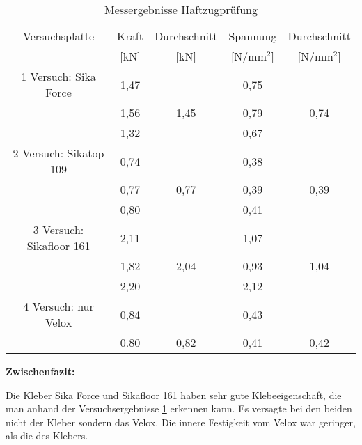 \documentclass[12 pt,a4 paper ]{scrreprt}
\begin{document}
\begin{table}
\caption{Messergebnisse Haftzugprüfung}
\begin{center}

\begin{tabular}{|c|c|c|c|c|} \hline
Versuchsplatte & Kraft & Durchschnitt & Spannung &Durchschnitt \\

	& [kN] & [kN] & [N/mm$^{2}$] & [N/mm$^{2}$] \\
	\hline\hline
 \cline{2-2} 1 Versuch: Sika Force  & 1,47 & & 0,75& \\\cline{2-2}&1,56 &1,45 &0,79 &0,74 \\\cline{2-2}&1,32 & &0,67 & 
\\\hline\hline

 \cline{2-2} 2 Versuch: Sikatop 109  & 0,74 & & 0,38& \\\cline{2-2}&0,77 &0,77 &0,39 &0,39 \\\cline{2-2}&0,80 & &0,41 & 
\\\hline\hline

 \cline{2-2} 3 Versuch: Sikafloor 161  & 2,11 & & 1,07& \\\cline{2-2}&1,82 &2,04 &0,93 &1,04 \\\cline{2-2}&2,20 & &2,12 & 
\\\hline\hline


 \cline{2-2} 4 Versuch: nur Velox  & 0,84 & & 0,43& \\\cline{2-2}&0.80 &0,82 &0,41 &0,42 
\\\hline

\end{tabular}
 \label{tab:1 kleberversuche}

\end{center}
\end{table}




\textbf{Zwischenfazit:}
\newline

Die Kleber Sika Force und Sikafloor 161 haben sehr gute Klebeeigenschaft, die man anhand der Versuchsergebnisse \ref{tab:1 kleberversuche} erkennen kann. Es versagte bei den beiden nicht der Kleber sondern das Velox. Die innere Festigkeit vom Velox war geringer, als die des Klebers. 
\end{document}
